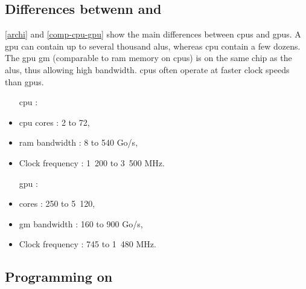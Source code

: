 \appendix

\label{principegpu}
\subsection{Differences betwenn  and }

\autoref{archi} and \autoref{comp-cpu-gpu} show the main differences between \glspl{cpu} and \glspl{gpu}. 
A \gls{gpu} can contain up to several thousand \glspl{alu}, whereas \gls{cpu} contain a few dozens.
The \gls{gpu} \gls{gm} (comparable to \gls{ram} memory on \glspl{cpu}) is on the same chip as the \glspl{alu}, thus allowing high bandwidth.
\glspl{cpu} often operate at faster clock speeds than \glspl{gpu}.

\begin{table}[H]
\begin{multicols}{2}
\begin{itemize}
\item [\gls{cpu} :]
\item \gls{cpu} cores : 2 to 72,
\item \gls{ram} bandwidth : 8 to 540 Go/s,
\item Clock frequency : 1~200 to 3~500 MHz.
\end{itemize}
\columnbreak
\begin{itemize}
\item [\gls{gpu} :]
\item {} cores : 250 to 5~120,
\item \Gls{gm} bandwidth : 160 to 900 Go/s,
\item Clock frequency : 745 to 1~480 MHz.
\end{itemize}
\end{multicols}
\caption{Comparison of typical specifications of \glspl{cpu} and \glspl{gpu}}
\label{comp-cpu-gpu}
\end{table}



\subsection{Programming on }
\label{partgpu}

